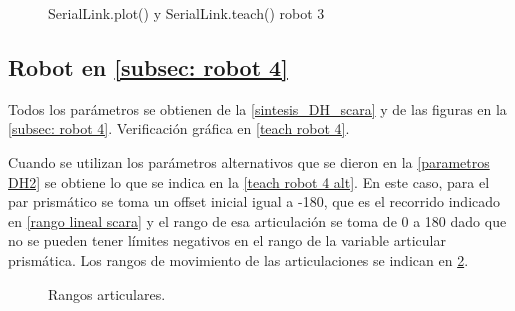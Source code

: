 \documentclass[a4paper,12pt]{article}
\begin{document}
\begin{figure}[H]
    \centering
    \begin{adjustbox}{scale = 0.9, max width=\columnwidth}
    \end{adjustbox}
    \caption{SerialLink.plot() y SerialLink.teach() robot 3}
    \label{teach robot 3}
\end{figure}

\subsection{Robot en \cref{subsec: robot 4}}
Todos los parámetros se obtienen de la \cref{sintesis_DH_scara}
y de las figuras en la \cref{subsec: robot 4}. Verificación gráfica en \cref{teach robot 4}.

Cuando se utilizan los parámetros alternativos que se dieron en la \cref{parametros DH2}
se obtiene lo que se indica en la \cref{teach robot 4 alt}.
En este caso, para el par prismático se toma un offset inicial igual a -180, que es el recorrido indicado en
\cref{rango lineal scara} y el rango de esa articulación se toma de 0 a 180 dado que no se pueden tener límites negativos en el rango de la variable articular prismática.
Los rangos de movimiento de las articulaciones se indican en \cref{rangos scara}.


\begin{figure}[H]
    \centering
    \begin{adjustbox}{scale = 0.8, max width=\columnwidth}
    \end{adjustbox}
    \caption{Rangos articulares.}
    \label{rangos scara}
\end{figure}
\end{document}
